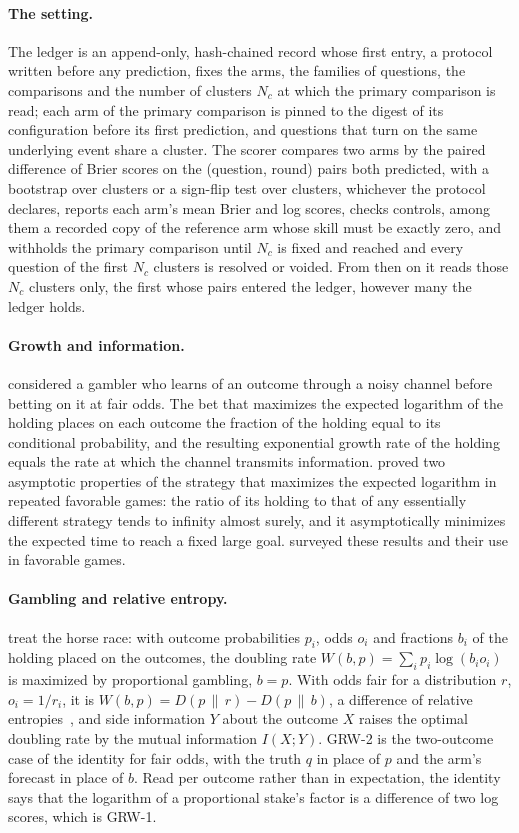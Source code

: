 \documentclass[11pt]{article}
\theoremstyle{plain}
\theoremstyle{definition}
\theoremstyle{remark}
\begin{document}
\paragraph{The setting.} The ledger is an append-only, hash-chained record whose first entry, a
protocol written before any prediction, fixes the arms, the families of questions, the comparisons
and the number of clusters $N_c$ at which the primary comparison is read; each arm of the primary
comparison is pinned to the digest of its configuration before its first prediction, and questions
that turn on the same underlying event share a cluster. The scorer compares two arms by the paired
difference of Brier scores on the (question, round) pairs both predicted, with a bootstrap over
clusters or a sign-flip test over clusters, whichever the protocol declares, reports each arm's mean
Brier and log scores, checks controls, among them a recorded copy of the reference arm whose skill
must be exactly zero, and withholds the primary comparison until $N_c$ is fixed and reached and
every question of the first $N_c$ clusters is resolved or voided. From then on it reads those $N_c$
clusters only, the first whose pairs entered the ledger, however many the ledger holds.

\paragraph{Growth and information.} \citet{kelly1956} considered a gambler who learns of an outcome
through a noisy channel before betting on it at fair odds. The bet that maximizes the expected
logarithm of the holding places on each outcome the fraction of the holding equal to its
conditional probability, and the resulting exponential growth rate of the holding equals the rate
at which the channel transmits information. \citet{breiman1961} proved two asymptotic properties of
the strategy that maximizes the expected logarithm in repeated favorable games: the ratio of its
holding to that of any essentially different strategy tends to infinity almost surely, and it
asymptotically minimizes the expected time to reach a fixed large goal. \citet{thorp1969} surveyed
these results and their use in favorable games.

\paragraph{Gambling and relative entropy.} \citet[chap.~6]{cover2006} treat the horse race: with
outcome probabilities $p_i$, odds $o_i$ and fractions $b_i$ of the holding placed on the outcomes,
the doubling rate $W(b,p)=\sum_i p_i\log(b_i o_i)$ is maximized by proportional gambling, $b=p$.
With odds fair for a distribution $r$, $o_i=1/r_i$, it is $W(b,p)=D(p\,\|\,r)-D(p\,\|\,b)$, a
difference of relative entropies~\citep{kullback1951}, and side information $Y$ about the outcome
$X$ raises the optimal doubling rate by the mutual information $I(X;Y)$. GRW-2 is the two-outcome
case of the identity for fair odds, with the truth $q$ in place of $p$ and the arm's forecast in
place of $b$. Read per outcome rather than in expectation, the identity says that the logarithm of a
proportional stake's factor is a difference of two log scores, which is GRW-1.
\end{document}
